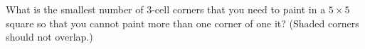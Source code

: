 What is the smallest number of $3$-cell corners that you need to paint in a $5 \times5$ square so that you cannot paint more than one corner of one it?
(Shaded corners should not overlap.)